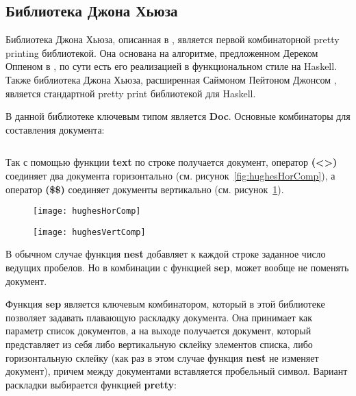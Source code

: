 \subsection{Библиотека Джона Хьюза}

Библиотека Джона Хьюза, описанная в \cite{hughes}, является первой комбинаторной pretty printing библиотекой. Она основана на алгоритме, предложенном Дереком Оппеном в \cite{oppen}, по сути есть его реализацией в функциональном стиле на Haskell. Также библиотека Джона Хьюза, расширенная Саймоном Пейтоном Джонсом \cite{peytonJones}, является стандартной pretty print библиотекой для Haskell.


В данной библиотеке ключевым типом является \textbf{Doc}. Основные комбинаторы для составления документа:
\inputminted{haskell}{codes/hughesBasicOperators.hs}

Так с помощью функции \textbf{text} по строке получается документ, оператор \textbf{(<>)} соединяет два документа горизонтально (см. рисунок~\ref{fig:hughesHorComp}), а оператор \textbf{(\$\$)} соединяет документы вертикально (см. рисунок~\ref{fig:hughesVertComp}).

\begin{figure}[h!]
	\begin{minipage}[b]{0.45\linewidth}
		\centering
		\texttt{[image: hughesHorComp]}
		\caption{}
		\label{fig:hughesHorComp}
	\end{minipage}
	\hspace{0.5cm}
	\begin{minipage}[b]{0.45\linewidth}
		\centering
		\texttt{[image: hughesVertComp]}
		\caption{}
		\label{fig:hughesVertComp}
	\end{minipage}
\end{figure}

В обычном случае функция \textbf{nest} добавляет к каждой строке заданное число ведущих пробелов. Но в комбинации с функцией \textbf{sep}, может вообще не поменять документ.

Функция \textbf{sep} является ключевым комбинатором, который в этой библиотеке позволяет задавать плавающую раскладку документа. Она принимает как параметр список документов, а на выходе получается документ, который представляет из себя либо вертикальную склейку элементов списка, либо горизонтальную склейку (как раз в этом случае функция \textbf{nest} не изменяет документ), причем между документами вставляется пробельный символ. Вариант раскладки выбирается функцией \textbf{pretty}:

